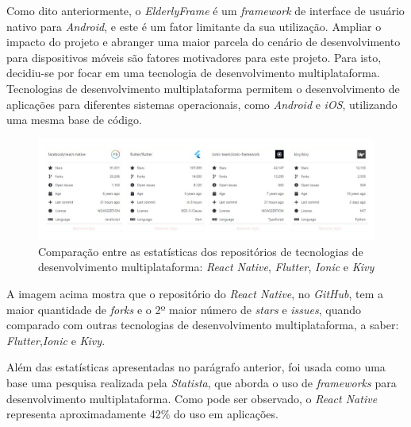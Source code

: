 \documentclass[
	12pt,				    %
	openright,			    %
	oneside,			    %
	a4paper,			    %
    sumario=tradicional,    %
	english,			    %
	brazil,				    %
	]{abntex2}              %
\begin{document}
Como dito anteriormente, o \textit{ElderlyFrame} é um \textit{framework} de interface de usuário nativo para \textit{Android}, e este é um fator limitante da sua utilização. Ampliar o impacto do projeto e abranger uma maior parcela do cenário de desenvolvimento para dispositivos móveis são fatores motivadores para este projeto. Para isto, decidiu-se por focar em uma tecnologia de desenvolvimento multiplataforma. Tecnologias de desenvolvimento multiplataforma permitem o desenvolvimento de aplicações para diferentes sistemas operacionais, como \emph{Android} e \emph{iOS}, utilizando uma mesma base de código.

\begin{figure}[H]
	\begin{center}
		\includegraphics[width=1\linewidth]{images/github-compare.png}
	\end{center}
	\caption[Comparativo de estatísticas dos repositórios de tecnologias de desenvolvimento multiplataforma]{Comparação entre as estatísticas dos repositórios de tecnologias de desenvolvimento multiplataforma: \textit{React Native}, \textit{Flutter}, \textit{Ionic} e \textit{Kivy}}
	\label{fig:githubCompare}
\end{figure}

A imagem acima mostra que o repositório do \textit{React Native}, no \textit{GitHub}, tem a maior quantidade de \textit{forks} e o 2º maior número de \textit{stars} e \textit{issues}, quando comparado com outras tecnologias de desenvolvimento multiplataforma, a saber: \textit{Flutter},\textit{Ionic} e \textit{Kivy}.

Além das estatísticas apresentadas no parágrafo anterior, foi usada como uma base uma pesquisa realizada pela \textit{Statista}, que aborda o uso de \textit{frameworks} para desenvolvimento multiplataforma. Como pode ser observado, o \textit{React Native} representa aproximadamente 42\% do uso em aplicações.
\end{document}
